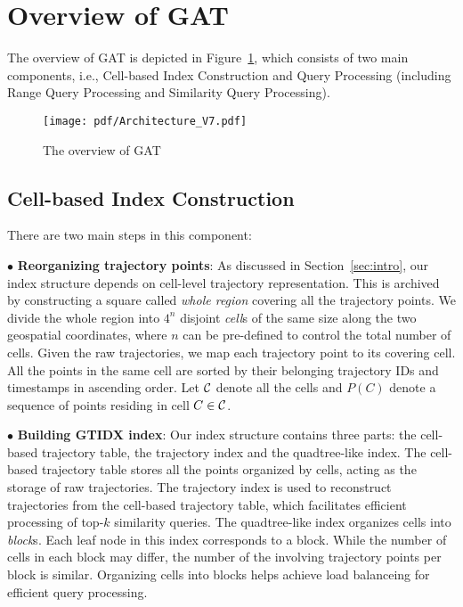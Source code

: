 \documentclass[10pt,conference,letterpaper]{IEEEtran}
\newcommand{\frname}{GAT\xspace }
\newcommand{\idxname}{GTIDX\xspace }
\newcommand{\allcell}{{\cal C}\xspace}
\begin{document}
\section{Overview of \frname}\label{sec:framework}




The overview of \frname is depicted in Figure~\ref{fig:arch}, which consists of two main components, i.e., Cell-based Index Construction and Query Processing (including Range Query Processing and Similarity Query Processing).

\begin{figure}[t]
	\centering
	\texttt{[image: pdf/Architecture\_V7.pdf]}
	\vspace{-.2in}
	\caption{The overview of \frname}\label{fig:arch}
	\vspace{-.1in}
\end{figure}

\subsection{Cell-based Index Construction}

There are two main steps in this component:

\vspace{0.1cm}$\bullet$ {\bf Reorganizing trajectory points}:
As discussed in Section~\ref{sec:intro}, our index structure depends on cell-level trajectory representation. This is archived by constructing a square called \emph{whole region}
covering all the trajectory points. We divide the whole region into $4^n$ disjoint \emph{cell}s of the same size along the two geospatial coordinates, where $n$ can be pre-defined to control the total number of cells. Given the raw trajectories, we map each trajectory point to its covering cell. All the points in the same cell are sorted by their belonging trajectory IDs and timestamps in ascending order. Let $\allcell$ denote all the cells and $P(C)$ denote a sequence of points residing in cell $C\in \allcell$.


\vspace{0.1cm}$\bullet$ {\bf Building \idxname index}:
Our index structure contains three parts: the cell-based trajectory table, the trajectory index and the quadtree-like index.
The cell-based trajectory table stores all the points organized by cells, acting as the storage of raw trajectories.
The trajectory index is used to reconstruct trajectories from the cell-based trajectory table, which facilitates efficient processing of top-$k$ similarity queries.
The quadtree-like index organizes cells into \emph{block}s. Each leaf node in this index corresponds to a block. While the number of cells in each block may differ, the number of the involving trajectory points per block is similar. Organizing cells into blocks helps achieve load balanceing for efficient query processing.
\end{document}
